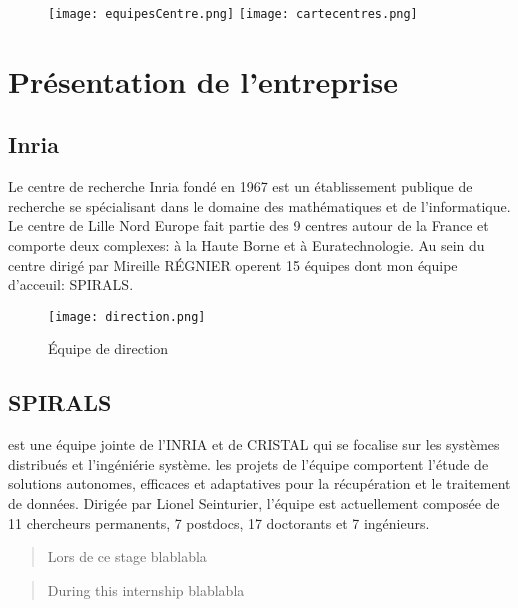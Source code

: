 \documentclass[oneside,a4paper,12pt]{article}
\begin{document}
\begin{figure}[h]
	\centering
	\texttt{[image: equipesCentre.png]}
	\texttt{[image: cartecentres.png]}
\end{figure}

\section{Présentation de l'entreprise} \label{PresentationInria}

\subsection{Inria}
Le centre de recherche Inria fondé en 1967 est un établissement publique de recherche se spécialisant dans le domaine des mathématiques et de l'informatique.\\ 
Le centre de Lille Nord Europe fait partie des 9 centres autour de la France et comporte deux complexes: à la Haute Borne et à Euratechnologie. 
Au sein du centre dirigé par Mireille R\'EGNIER operent 15 équipes dont mon équipe d'acceuil: SPIRALS. 

\begin{figure}[h]
	\centering
	\texttt{[image: direction.png]}
	\caption{\'Equipe de direction}
\end{figure}

\subsection{SPIRALS} est une équipe jointe de l'INRIA et de CRISTAL qui se focalise sur les systèmes distribués et l'ingéniérie système. les projets de l'équipe comportent l'étude de solutions autonomes, efficaces et adaptatives pour la récupération et le traitement de données. Dirigée par Lionel Seinturier, l'équipe est actuellement composée de 11 chercheurs permanents, 7 postdocs, 17 doctorants et 7 ingénieurs.


\appendix

\newpage

\begin{center}
	
	\vspace{2cm}
	\renewcommand{\abstractname}{Résumé}
	\begin{abstract}
	
	Lors de ce stage blablabla

	\end{abstract}
	\vspace{\fill}	
	\renewcommand{\abstractname}{Abstract}
	\begin{abstract}
	
	During this internship blablabla

	\end{abstract}

	\vspace{2cm}

\end{center}
\end{document}
